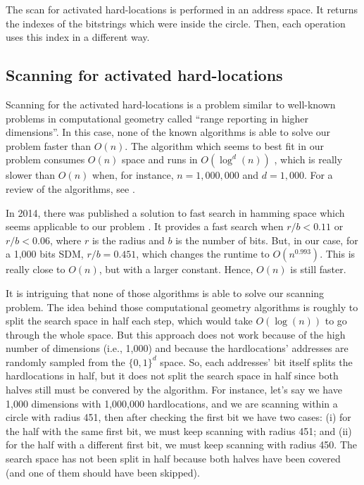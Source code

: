 The scan for activated hard-locations is performed in an address space. It returns the indexes of the bitstrings which were inside the circle. Then, each operation uses this index in a different way.

\subsection{Scanning for activated hard-locations}

Scanning for the activated hard-locations is a problem similar to well-known problems in computational geometry called ``range reporting in higher dimensions''. In this case, none of the known algorithms is able to solve our problem faster than $O(n)$. The algorithm which seems to best fit in our problem consumes $O(n)$ space and runs in $O(\log^d(n))$ \citep{chazelle1988functional}, which is really slower than $O(n)$ when, for instance, $n=1,000,000$ and $d=1,000$. For a review of the algorithms, see \citet{chan2011orthogonal}.

In 2014, there was published a solution to fast search in hamming space which seems applicable to our problem \citet{norouzi2014fast}. It provides a fast search when $r/b < 0.11$ or $r/b < 0.06$, where $r$ is the radius and $b$ is the number of bits. But, in our case, for a 1,000 bits SDM, $r/b = 0.451$, which changes the runtime to $O(n^{0.993})$. This is really close to $O(n)$, but with a larger constant. Hence, $O(n)$ is still faster.

It is intriguing that none of those algorithms is able to solve our scanning problem. The idea behind those computational geometry algorithms is roughly to split the search space in half each step, which would take $O(\log(n))$ to go through the whole space. But this approach does not work because of the high number of dimensions (i.e., 1,000) and because the hardlocations' addresses are randomly sampled from the $\{0, 1\}^d$ space. So, each addresses' bit itself splits the hardlocations in half, but it does not split the search space in half since both halves still must be convered by the algorithm. For instance, let's say we have 1,000 dimensions with 1,000,000 hardlocations, and we are scanning within a circle with radius 451, then after checking the first bit we have two cases: (i) for the half with the same first bit, we must keep scanning with radius 451; and (ii) for the half with a different first bit, we must keep scanning with radius 450. The search space has not been split in half because both halves have been covered (and one of them should have been skipped).

